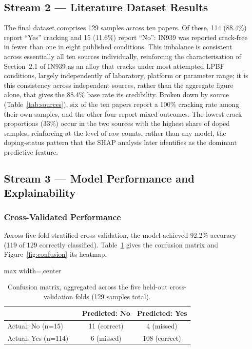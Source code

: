 \documentclass[a4paper]{article}
\newcommand{\sz}[1]{\fpeval{#1*\bodysize/14}}     %
\renewcommand{\small}{\fontsize{\sz{11.7}}{\sz{15.6}}\selectfont}
\begin{document}
\subsection{Stream 2 --- Literature Dataset Results}
The final dataset comprises 129 samples across ten papers. Of these, 114 (88.4\%) report ``Yes'' cracking and 15 (11.6\%) report ``No'': IN939 was reported crack-free in fewer than one in eight published conditions. This imbalance is consistent across essentially all ten sources individually, reinforcing the characterisation of Section~2.1 of IN939 as an alloy that cracks under most attempted LPBF conditions, largely independently of laboratory, platform or parameter range; it is this consistency across independent sources, rather than the aggregate figure alone, that gives the 88.4\% base rate its credibility. Broken down by source (Table~\ref{tab:sources}), six of the ten papers report a 100\% cracking rate among their own samples, and the other four report mixed outcomes. The lowest crack proportions (33\%) occur in the two sources with the highest share of doped samples, reinforcing at the level of raw counts, rather than any model, the doping-status pattern that the SHAP analysis later identifies as the dominant predictive feature.

\subsection{Stream 3 --- Model Performance and Explainability}
\subsubsection{Cross-Validated Performance}
Across five-fold stratified cross-validation, the model achieved 92.2\% accuracy (119 of 129 correctly classified). Table~\ref{tab:confusion} gives the confusion matrix and Figure~\ref{fig:confusion} its heatmap.

\begin{table}[t]
\centering
\small
\begin{adjustbox}{max width=\textwidth,center}
\begin{tabular}{llcc}
\toprule
 & & Predicted: No & Predicted: Yes \\
\midrule
Actual: No (n=15) & & 11 (correct) & 4 (missed) \\
Actual: Yes (n=114) & & 6 (missed) & 108 (correct) \\
\bottomrule
\end{tabular}
\end{adjustbox}
\caption{Confusion matrix, aggregated across the five held-out cross-validation folds (129 samples total).}
\label{tab:confusion}
\end{table}
\end{document}
